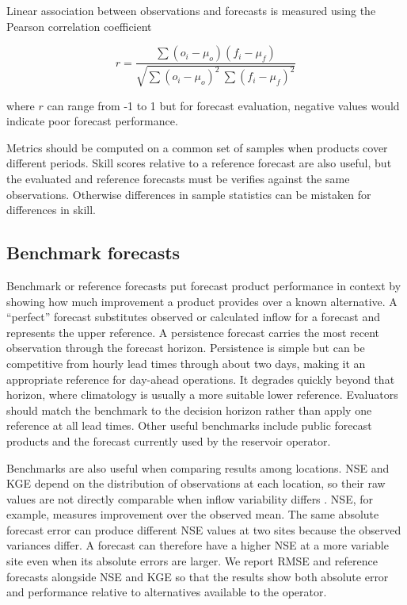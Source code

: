 \documentclass[MLA]{USG} %
\begin{document}
Linear association between observations and forecasts is measured using the Pearson correlation coefficient

\begin{equation}
    r = \frac{\sum(o_i-\mu_o)(f_i-\mu_f)}{\sqrt{\sum(o_i-\mu_o)^2\ \sum(f_i-\mu_f)^2}}
\end{equation}

where $r$ can range from -1 to 1 but for forecast evaluation, negative values would indicate poor forecast performance.

Metrics should be computed on a common set of samples when products cover different periods. Skill scores relative to a reference forecast are also useful, but the evaluated and reference forecasts must be verifies against the same observations. Otherwise differences in sample statistics can be mistaken for differences in skill.

\subsection{Benchmark forecasts}\label{sec:benchmarks}
Benchmark or reference forecasts put forecast product performance in context by showing how much improvement a product provides over a known alternative. A ``perfect'' forecast substitutes observed or calculated inflow for a forecast and represents the upper reference. A persistence forecast carries the most recent observation through the forecast horizon. Persistence is simple but can be competitive from hourly lead times through about two days, making it an appropriate reference for day-ahead operations. It degrades quickly beyond that horizon, where climatology is usually a more suitable lower reference. Evaluators should match the benchmark to the decision horizon rather than apply one reference at all lead times. Other useful benchmarks include public forecast products and the forecast currently used by the reservoir operator.

Benchmarks are also useful when comparing results among locations. NSE and KGE depend on the distribution of observations at each location, so their raw values are not directly comparable when inflow variability differs \citep{knobenTechnicalNoteInherent2019a}. NSE, for example, measures improvement over the observed mean. The same absolute forecast error can produce different NSE values at two sites because the observed variances differ. A forecast can therefore have a higher NSE at a more variable site even when its absolute errors are larger. We report RMSE and reference forecasts alongside NSE and KGE so that the results show both absolute error and performance relative to alternatives available to the operator.
\end{document}
